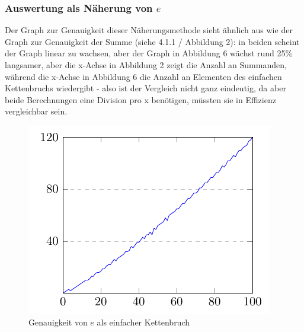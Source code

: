 \subsubsection{Auswertung als Näherung von $e$}
Der Graph zur Genauigkeit dieser Näherungsmethode sieht ähnlich aus wie der Graph zur Genauigkeit der Summe (siehe 4.1.1 / Abbildung 2): in beiden scheint der Graph linear zu wachsen, aber der Graph in Abbildung 6 wächst rund 25\% langsamer, aber die x-Achse in Abbildung 2 zeigt die Anzahl an Summanden, während die x-Achse in Abbildung 6 die Anzahl an Elementen des einfachen Kettenbruchs wiedergibt - also ist der Vergleich nicht ganz eindeutig, da aber beide Berechnungen eine Division pro x benötigen, müssten sie in Effizienz vergleichbar sein.
\begin{figure}[h]
  \includegraphics{medien2/kettenbruch/kettenbruch.pdf}
  \centering
\caption{Genauigkeit von $e$ als einfacher Kettenbruch}
\end{figure}
\newpage
